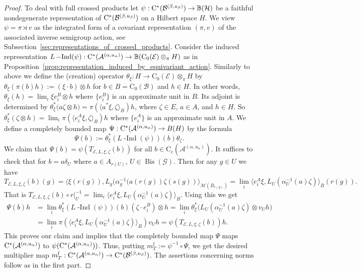 \documentclass[11 pt, leqno]{amsart}
\numberwithin{equation}{section}
\theoremstyle{plain}
\theoremstyle{definition}
\newcommand*{\contc}{\mathrm{C_c}}%
\newcommand*{\contz}{\mathrm{C_0}}%
\DeclareMathOperator{\f}{f}%
\DeclareMathOperator{\dashind}{-Ind}
\DeclareMathOperator{\Bis}{Bis}
\renewcommand{\H}{\mathcal H}
\newcommand{\B}{\mathcal B}
\newcommand{\BB}{\mathbb B}
\newcommand{\M}{\mathcal M}
\newcommand{\m}{m}
\newcommand{\G}{\mathcal G} %
\newcommand{\EE}{\mathcal E}
\newcommand{\A}{\mathcal A}
\newcommand{\cst}{\ifmmode\mathrm{C}^*\else{$\mathrm{C}^*$}\fi}
\begin{document}
\begin{proof}
To deal with full crossed products let $\psi : \cst(\B^{(\beta,u_{\beta})})\to \BB(\H)$ be a faithful nondegenerate representation of $\cst(\B^{(\beta,u_{\beta})})$ on a Hilbert space $H$. 
We view $\psi=\pi\rtimes v$ as the integrated form of a covariant representation $(\pi,v)$ of the associated inverse semigroup action, see Subsection~\ref{sec:representations_of_crossed_products}.
Consider the induced representation $L\dashind(\psi):\cst(\A^{(\alpha,u_{\alpha})})\to \BB(\contz(\EE)\otimes_{\pi}H)$ as in Proposition~\ref{prop:representation_induced_by_equivariant_action}. 
Similarly to above we define the (creation) operator $\theta_\xi : H \to \contz(\EE)\otimes_{\pi} H$ by $\theta_\xi (\pi(b)h):=(\xi\cdot b)\otimes h$ for $b\in B=\contz(\B)$ and $h\in H$.
In other words, $\theta_\xi (h)=\lim_{i} \xi e_i^B \otimes h$ where $\{e_i^B\}$ is an approximate unit in $B$. 
Its adjoint is determined by $\theta_\xi^*\big( a\zeta \otimes h)= \pi (\langle a^*\xi,\zeta\rangle_{B}) h$, where $\zeta\in E$, $a\in A$, and $h\in H$. %
So $\theta_\xi^* (\zeta \otimes h)=\lim_{i} \pi (\langle e_i^A \xi,\zeta\rangle_{B}) h$ where $\{e_i^A\}$ is an approximate unit in $A$. 
We define a completely bounded map $\Psi:\cst(\A^{(\alpha,u_{\alpha})})\to B(H)$ by the formula
\[
    \Psi(b) := \theta_\xi^* (L\dashind(\psi))(b) \theta_\zeta.
\]
We claim that $\Psi(b) = \psi (T_{\EE,L,\xi,\zeta}(b))$ for all $b\in \contc(\A^{(\alpha,u_{\alpha})})$. 
It suffices to check that for $b=a\delta_{U}$ where $a\in A_{r(U)}$, $U\in \Bis(\G)$. 
Then for any $g\in U$ we have
\[
    T_{\EE,L,\xi,\zeta}(b)(g) = \langle \xi(r(g)),  L_{g}(\alpha_g^{-1}(a(r(g))\zeta(s(g))\rangle_{\M(B_{r(g)})} = \lim_{i} \langle e_i^A \xi,L_U(\alpha_{U}^{-1}(a)\zeta ) \rangle_{B}(r(g)).
\]
That is $T_{\EE,L,\xi,\zeta}(b)\circ r|_U^{-1}=\lim_{i} \langle e_i^A \xi,L_U(\alpha_{U}^{-1}(a)\zeta ) \rangle_{B}$.
Using this we get
\[
\begin{split}
    \Psi(b)h &= \lim_{i} \theta_\xi^* (L\dashind(\psi))(b) (\zeta\cdot e_i^B)\otimes h = \lim_{i} \theta_\xi^* \big( L_U(\alpha_{U}^{-1}(a)\zeta)\otimes v_{U} h \big) \\
        &= \lim_{i} \pi (\langle e_i^A \xi,L_U(\alpha_{U}^{-1}(a)\zeta ) \rangle_{B}) v_Uh = \psi ( T_{\EE,L,\xi,\zeta}(b)) h.
\end{split}
\]
This proves our claim and implies that the completely bounded map $\Psi$ maps $\cst(\A^{(\alpha,u_{\alpha})})$ to $\psi(\cst(\A^{(\alpha,u_{\alpha})}))$. 
Thus, putting $\m_T^{\f} := \psi^{-1}\circ \Psi$, we get the desired multiplier map $\m_T^{\f} : \cst(\A^{(\alpha,u_{\alpha})})\to \cst(\B^{(\beta,u_{\beta})})$.
The assertions concerning norms follow as in the first part. 
\end{proof}
\end{document}
